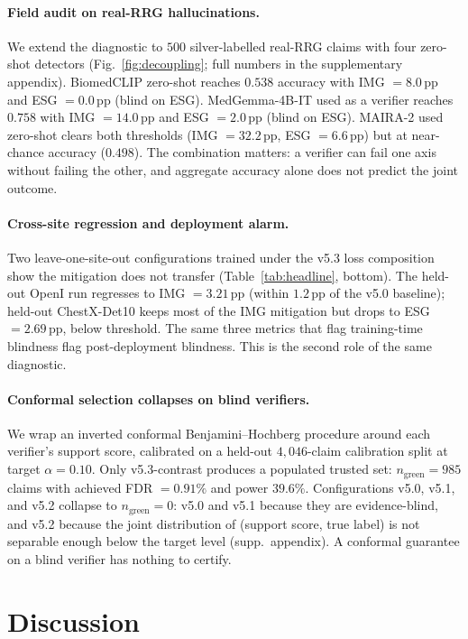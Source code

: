 \documentclass{article}
\begin{document}
\paragraph{Field audit on real-RRG hallucinations.} We extend the
diagnostic to $500$ silver-labelled real-RRG claims with four
zero-shot detectors (Fig.~\ref{fig:decoupling}; full numbers in
the supplementary appendix). BiomedCLIP zero-shot reaches
$0.538$ accuracy with IMG $= 8.0$\,pp and ESG $= 0.0$\,pp (blind on
ESG). MedGemma-4B-IT used as a verifier reaches $0.758$ with
IMG $= 14.0$\,pp and ESG $= 2.0$\,pp (blind on ESG). MAIRA-2 used
zero-shot clears both thresholds (IMG $= 32.2$\,pp,
ESG $= 6.6$\,pp) but at near-chance accuracy ($0.498$). The
combination matters: a verifier can fail one axis without failing
the other, and aggregate accuracy alone does not predict the joint
outcome.

\paragraph{Cross-site regression and deployment alarm.} Two
leave-one-site-out configurations trained under the v5.3 loss
composition show the mitigation does not transfer
(Table~\ref{tab:headline}, bottom). The held-out OpenI run
regresses to IMG $= 3.21$\,pp (within $1.2$\,pp of the v5.0
baseline); held-out ChestX-Det10 keeps most of the IMG mitigation
but drops to ESG $= 2.69$\,pp, below threshold. The same three
metrics that flag training-time blindness flag post-deployment
blindness. This is the second role of the same diagnostic.

\paragraph{Conformal selection collapses on blind verifiers.} We
wrap an inverted conformal Benjamini--Hochberg procedure around
each verifier's support score, calibrated on a held-out
$4{,}046$-claim calibration split at target $\alpha = 0.10$. Only
v5.3-contrast produces a populated trusted set:
$n_{\mathrm{green}} = 985$ claims with achieved FDR $= 0.91\%$ and
power $39.6\%$. Configurations v5.0, v5.1, and v5.2 collapse to
$n_{\mathrm{green}} = 0$: v5.0 and v5.1 because they are
evidence-blind, and v5.2 because the joint distribution of
(support score, true label) is not separable enough below the
target level (supp.\ appendix). A conformal guarantee
on a blind verifier has nothing to certify.

\section{Discussion}
\label{sec:discussion}
\end{document}
